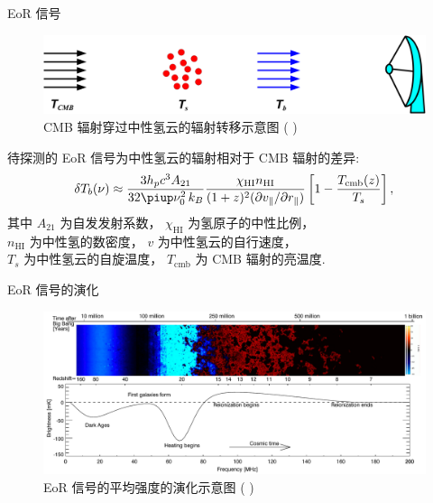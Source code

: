 \documentclass{beamer}
\newcommand{\R}[1]{\text{#1}}  %
\newcommand{\Cpi}{\piup}  %
\newcommand{\citeay}[1]{\citeauthor{#1} \citeyear{#1} \parencite{#1}}
\begin{document}
\begin{frame}{EoR 信号}
  \begin{figure}
    \centering
    \includegraphics[width=\textwidth]{21cm-radiative-transfer}
    \caption{CMB 辐射穿过中性氢云的辐射转移示意图 (\citeay{zaroubi2013})}
  \end{figure}

  待探测的 \alert{EoR 信号}为中性氢云的辐射相对于 CMB 辐射的\alert{差异}:
  \begin{equation}
    \delta T_b(\nu) \approx
      \frac{3 h_p c^3 A_{21}}{32\Cpi \nu_0^2 \,k_B}
      \frac{\chi_{\R{HI}} n_{\R{HI}}}{
        (1+z)^2 (\partial v_{\parallel} / \partial r_{\parallel})}
      \left[ 1 - \frac{T_{\R{cmb}}(z)}{T_s} \right] ,
  \end{equation}
  其中 $A_{21}$ 为自发发射系数，
  $\chi_{\R{HI}}$ 为氢原子的中性比例， \\
  $n_{\R{HI}}$ 为中性氢的数密度，
  $v$ 为中性氢云的自行速度， \\
  $T_s$ 为中性氢云的自旋温度，
  $T_{\R{cmb}}$ 为 CMB 辐射的亮温度.
\end{frame}

\begin{frame}{EoR 信号的演化}
  \begin{figure}
    \centering
    \includegraphics[width=\textwidth]{eor-signal-evolution}
    \caption{EoR 信号的平均强度的演化示意图 (\citeay{pritchard2012})}
  \end{figure}
\end{frame}
\end{document}
